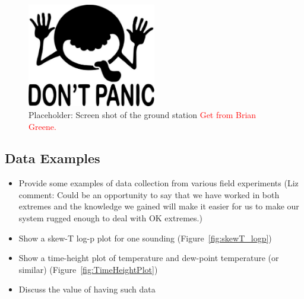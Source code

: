 \documentclass[sensors,review,submit,moreauthors,pdftex,10pt,a4paper]{mdpi}
\theoremstyle{mdpi}
\newcounter{ex}
\newcounter{re}
\theoremstyle{mdpidefinition}
\begin{document}
\begin{figure}
\centering
\includegraphics[angle=0, width=0.5\textwidth]{figures/dontPanic.pdf}
\caption{\label{fig:GroundStationScreen} Placeholder: Screen shot of the ground station \textcolor{red}{Get from Brian Greene.}}
\end{figure}

\subsection{Data Examples}
\begin{itemize}[leftmargin=*,labelsep=4mm]
\color{blue}
\item	Provide some examples of data collection from various field experiments (Liz comment: Could be an opportunity to say that we have worked in both extremes and the knowledge we gained will make it easier for us to make our system rugged enough to deal with OK extremes.)
\item	Show a skew-T log-p plot for one sounding (Figure~\ref{fig:skewT_logp})
\item	Show a time-height plot of temperature and dew-point temperature (or similar) (Figure~\ref{fig:TimeHeightPlot})
\item	Discuss the value of having such data
\end{itemize}
\end{document}
